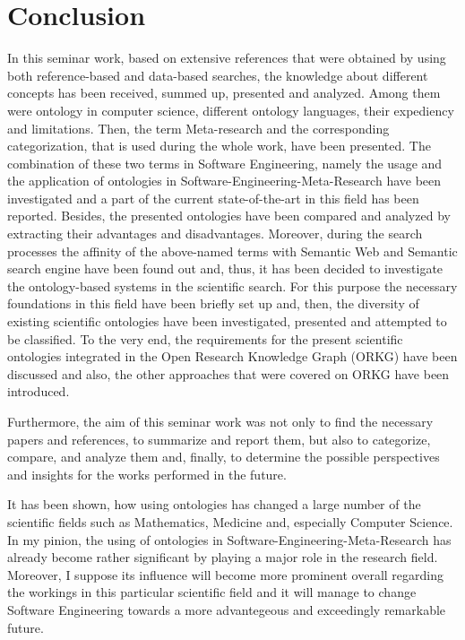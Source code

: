 
\section{Conclusion}
\label{ch:Conclusion}

In this seminar work, based on extensive references that were obtained by using both reference-based and data-based searches, the knowledge about different concepts has been received, summed up, presented and analyzed. Among them were ontology in computer science, different ontology languages, their expediency and limitations. Then, the term Meta-research and the corresponding categorization, that is used during the whole work, have been presented. The combination of these two terms in Software Engineering, namely the usage and the application of ontologies in Software-Engineering-Meta-Research have been investigated and a part of the current state-of-the-art in this field has been reported. Besides, the presented ontologies have been compared and analyzed by extracting their advantages and disadvantages. Moreover, during the search processes the affinity of the above-named terms with Semantic Web and Semantic search engine have been found out and, thus, it has been decided to investigate the ontology-based systems in the scientific search. For this purpose the necessary foundations in this field have been briefly set up and, then, the diversity of existing scientific ontologies have been investigated, presented and attempted to be classified. To the very end, the requirements for the present scientific ontologies integrated in the Open Research Knowledge Graph (ORKG) have been discussed and also, the other approaches that were covered on ORKG have been introduced.

Furthermore, the aim of this seminar work was not only to find the necessary papers and references, to summarize and report them, but also to categorize, compare, and analyze them and, finally, to determine the possible perspectives and insights for the works performed in the future. 

It has been shown, how using ontologies has changed a large number of the scientific fields such as Mathematics, Medicine and, especially Computer Science. In my pinion, the using of  ontologies in Software-Engineering-Meta-Research has already become rather significant by playing a major role in the research field. Moreover, I suppose its influence will become more prominent overall regarding the workings in this particular scientific field and it will manage to change Software Engineering towards a more advantegeous and exceedingly remarkable future.
